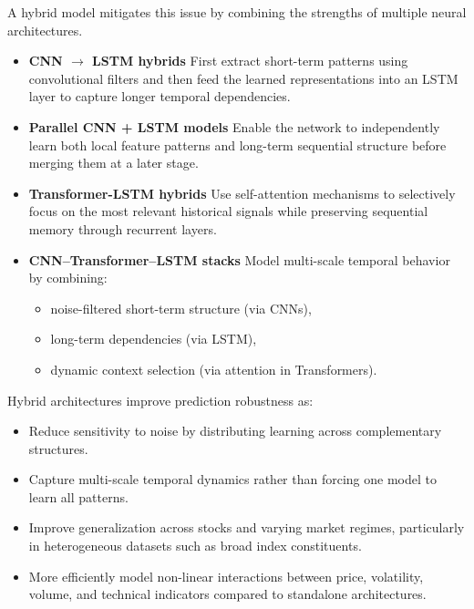 A hybrid model mitigates this issue by combining the strengths of multiple neural architectures.

\begin{itemize}
    \item \textbf{CNN $\rightarrow$ LSTM hybrids}  
    First extract short-term patterns using convolutional filters and then feed the learned representations into an LSTM layer to capture longer temporal dependencies.

    \item \textbf{Parallel CNN + LSTM models}  
    Enable the network to independently learn both local feature patterns and long-term sequential structure before merging them at a later stage.

    \item \textbf{Transformer-LSTM hybrids}  
    Use self-attention mechanisms to selectively focus on the most relevant historical signals while preserving sequential memory through recurrent layers.

    \item \textbf{CNN--Transformer--LSTM stacks}  
    Model multi-scale temporal behavior by combining:
    \begin{itemize}
        \item noise-filtered short-term structure (via CNNs),
        \item long-term dependencies (via LSTM),
        \item dynamic context selection (via attention in Transformers).
    \end{itemize}
\end{itemize}

Hybrid architectures improve prediction robustness as:

\begin{itemize}
    \item Reduce sensitivity to noise by distributing learning across complementary structures.
    \item Capture multi-scale temporal dynamics rather than forcing one model to learn all patterns.
    \item Improve generalization across stocks and varying market regimes, particularly in heterogeneous datasets such as broad index constituents.
    \item More efficiently model non-linear interactions between price, volatility, volume, and technical indicators compared to standalone architectures.
\end{itemize}



